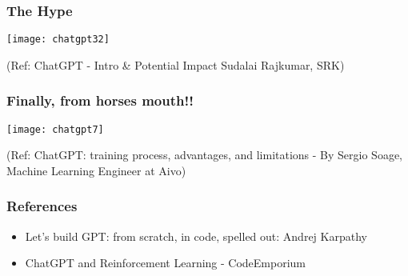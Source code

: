 \begin{frame}[fragile]\frametitle{The Hype}


\begin{center}
\texttt{[image: chatgpt32]}
\end{center}		

{\tiny (Ref: ChatGPT - Intro \& Potential Impact Sudalai Rajkumar, SRK)}
			

\end{frame}



\begin{frame}[fragile]\frametitle{Finally, from horses mouth!!}


\begin{center}
\texttt{[image: chatgpt7]}
\end{center}		

{\tiny (Ref: ChatGPT: training process, advantages, and limitations - By Sergio Soage, Machine Learning Engineer at Aivo)}
			

\end{frame}





			



\begin{frame}[fragile]\frametitle{References}
		\begin{itemize}
		\item Let's build GPT: from scratch, in code, spelled out: Andrej Karpathy
		\item ChatGPT and Reinforcement Learning - CodeEmporium
		\end{itemize}
\end{frame}
